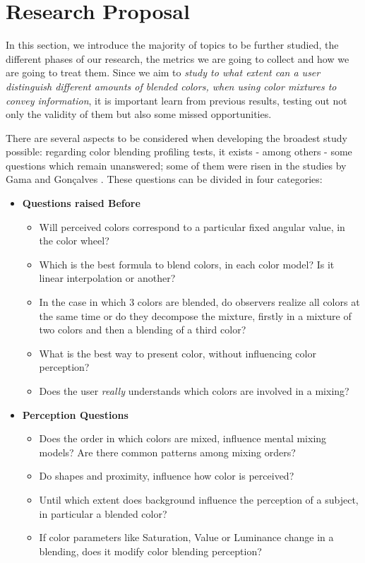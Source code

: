 
\chapter{Research Proposal}
\label{chapter:researchproposal}
In this section, we introduce the majority of topics to be further studied, the different phases of our research, the metrics we are going to collect and how we are going to treat them. Since we aim to \emph{study to what extent can a user distinguish different amounts of blended colors, when using color mixtures to convey information}, it is important learn from previous results, testing out not only the validity of them but also some missed opportunities. \par
There are several aspects to be considered when developing the broadest study possible: regarding color blending profiling tests, it exists - among
others - some questions which remain unanswered; some of them were risen in the studies by Gama and Gonçalves \cite{Gama20141,Gama20142}. These questions can be divided in four categories:
%
\begin{itemize}
	\setlength\itemsep{0.1em}
	\item \textbf{Questions raised Before}
    \begin{itemize}
    	\setlength\itemsep{0.1em}
		\item Will perceived colors correspond to a particular fixed angular value, in the color wheel?
        \item Which is the best formula to blend colors, in each color model? Is it linear interpolation or another?
        \item In the case in which 3 colors are blended, do observers realize all colors at the same time or do they decompose the mixture, firstly in a mixture of two colors and then a blending of a third color?
        \item What is the best way to present color, without influencing color perception?
        \item Does the user \emph{really} understands which colors are involved in a mixing?
	\end{itemize}
    \item \textbf{Perception Questions}
    \begin{itemize}
    	\setlength\itemsep{0.1em}
    	\item Does the order in which colors are mixed, influence mental mixing models? Are there common patterns among mixing orders?
        \item Do shapes and proximity, influence how color is perceived?
        \item Until which extent does background influence the perception of a subject, in particular a blended color?
        \item If color parameters like Saturation, Value or Luminance change in a blending, does it modify color blending perception?
    \end{itemize}
\end{itemize}
